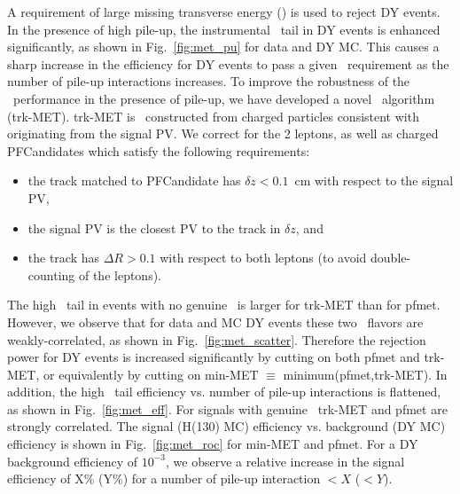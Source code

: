 A requirement of large missing transverse energy (\met) is used to reject DY events.
In the presence of high pile-up, the instrumental \met\ tail in DY events is enhanced
significantly, as shown in Fig.~\ref{fig:met_pu} for data and DY MC. This causes a sharp increase in the
efficiency for DY events to pass a given \met\ requirement as the number of pile-up
interactions increases. To improve the robustness of the \met\ performance
in the presence of pile-up, we have developed a novel \met\ algorithm (trk-MET).
trk-MET is \met\ constructed from charged particles consistent with originating from
the signal PV. We correct for the 2 leptons, as well as charged PFCandidates which satisfy
the following requirements:
\begin{itemize}
\item the track matched to PFCandidate has $\delta z < 0.1$~cm with respect to the signal PV,
\item the signal PV is the closest PV to the track in $\delta z$, and
\item the track has $\Delta R > 0.1$ with respect to both leptons (to avoid double-counting of the leptons).
\end{itemize}
The high \met\ tail in events with no genuine \met\ is larger for trk-MET than for pfmet. However,
we observe that for data and MC DY events these two \met\ flavors are weakly-correlated, as shown
in Fig.~\ref{fig:met_scatter}. Therefore the rejection power for DY events is increased significantly
by cutting on both pfmet and trk-MET, or equivalently by cutting on min-MET $\equiv$ minimum(pfmet,trk-MET).
In addition, the high \met\ tail efficiency vs. number of pile-up interactions is flattened, as shown
in Fig.~\ref{fig:met_eff}. For signals with genuine \met\, trk-MET and pfmet are strongly correlated. 
The signal (H(130) MC) efficiency vs. background (DY MC) efficiency is shown in Fig.~\ref{fig:met_roc}
for min-MET and pfmet. For a DY background efficiency of $10^{-3}$, we observe a relative increase
in the signal efficiency of X\% (Y\%) for a number of pile-up interaction $<X$ ($<Y$).
 
